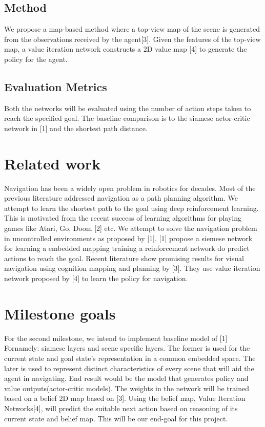 \documentclass{article}
\begin{document}
\subsection{Method}
We propose a map-based method where a top-view map of the scene is generated from the observations received by the agent[3]. Given the features of the top-view map, a value iteration network constructs a 2D value map [4] to generate the policy for the agent.

\subsection{Evaluation Metrics}
Both the networks will be evaluated using the number of action steps taken to reach the specified goal. The baseline comparison is to the siamese actor-critic network in [1] and the shortest path distance.

\section{Related work}
Navigation has been a widely open problem in robotics for decades. Most of the previous literature addressed navigation as a path planning algorithm. We attempt to learn the shortest path to the goal using deep reinforcement learning. This is motivated from the recent success of learning algorithms for playing games like Atari, Go, Doom [2] etc. We attempt to solve the navigation problem in uncontrolled environments as proposed by [1]. [1] propose a siemese network for learning a embedded mapping training a reinforcement network do predict actions to reach the goal. Recent literature show promising results for visual navigation using cognition mapping and planning  by [3]. They use value iteration network proposed by [4] to learn the policy for navigation.  

\section*{Milestone goals}
For the second milestone, we intend to implement baseline model of [1] Fornamely: siamese layers and scene specific layers. The former is used for the current state and goal state's representation in a common embedded space. The later is used to represent distinct characteristics of every scene that will aid the agent in navigating. End result would be the  model that generates policy and value outputs(actor-critic models). The weights in the network will be trained based on a belief 2D map based on [3]. Using the belief map, Value Iteration Networks[4], will predict the suitable next action based on reasoning of its current state and belief map. This will be our end-goal for this project. 
\end{document}
